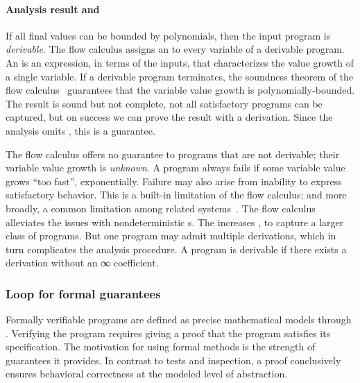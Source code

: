 \paragraph*{Analysis result and }
If all final values can be bounded by polynomials, then the input program is
\emph{derivable}. The flow calculus assigns an \emph{} to every
variable of a derivable program. An  is an expression, in terms
of the inputs, that characterizes the value growth of a single variable. If a
derivable program terminates, the soundness theorem of the flow
calculus~\cite[p. 11]{jones2009} guarantees
that the variable value growth is polynomially-bounded. The result is sound but
not complete, \ie not all satisfactory programs can be captured, but on success
we can prove the result with a derivation. Since the analysis omits
, this is a  guarantee.

The flow calculus offers no guarantee to programs that are
not derivable; their variable value growth is
\emph{unknown}. A program always fails if some variable value grows \enquote{too
fast}, \eg exponentially. Failure may also arise from inability to express
satisfactory behavior. This is a built-in limitation of the flow calculus; and
more broadly, a common limitation among related systems~\cite[p.
2]{baillot2015}. The flow calculus alleviates the issues with
nondeterministic s. The
 increases , to capture a larger class
of programs. But one program may admit multiple derivations, which in turn
complicates the analysis procedure. A program is derivable
if there exists a derivation without an ∞ coefficient.

\subsubsection{Loop  for formal guarantees}
\label{subsec:specs}

Formally verifiable programs are defined as precise
mathematical models through . Verifying the program requires
giving a proof that the program satisfies its specification. The motivation for
using formal methods is the strength of guarantees it provides. In contrast to
tests and inspection, a proof conclusively ensures behavioral correctness at the
modeled level of abstraction.


